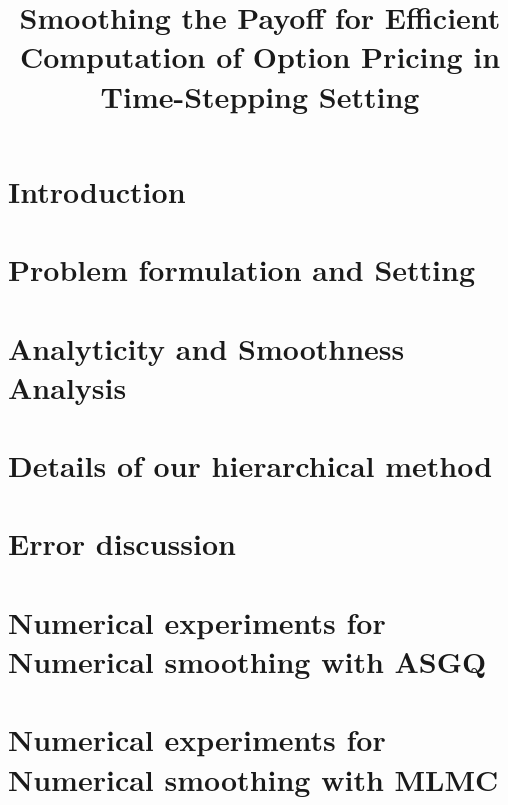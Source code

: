 \documentclass[11pt]{article}
\title{ Smoothing  the  Payoff for  Efficient Computation of Option Pricing in
  Time-Stepping Setting}
\date{ }
\begin{document}
\maketitle

%


\section{Introduction}



\section{Problem formulation and Setting}\label{sec:General setting}





%
\section{Analyticity  and Smoothness Analysis}\label{sec:Analiticity Analysis}

\section{Details of our hierarchical method}\label{sec:Details of our approach}



\section{Error discussion}\label{sec:Error discussion}


\section{Numerical experiments for Numerical smoothing with ASGQ}

\section{Numerical experiments for Numerical smoothing with MLMC}



 


%
\end{document}
